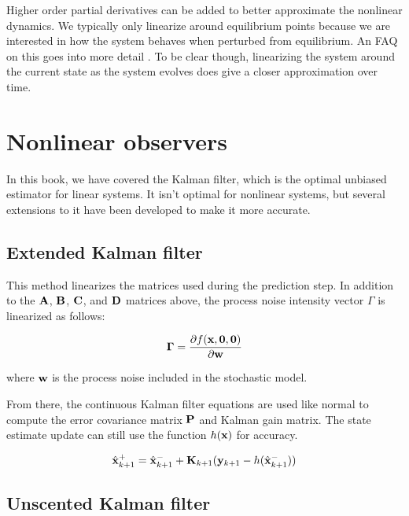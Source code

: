 Higher order partial derivatives can be added to better approximate the
nonlinear dynamics. We typically only linearize around equilibrium points
because we are interested in how the system behaves when perturbed from
equilibrium. An FAQ on this goes into more detail
\cite{bib:linearize-equilibrium-point}. To be clear though, linearizing the
system around the current state as the system evolves does give a closer
approximation over time.

\section{Nonlinear observers}

In this book, we have covered the Kalman filter, which is the optimal unbiased
estimator for linear systems. It isn't optimal for nonlinear systems, but
several extensions to it have been developed to make it more accurate.

\subsection{Extended Kalman filter}

This method linearizes the matrices used during the prediction step. In addition
to the $\mathbf{A}$, $\mathbf{B}$, $\mathbf{C}$, and $\mathbf{D}$ matrices above, the
process noise intensity vector $\Gamma$ is linearized as follows:

\begin{equation*}
  \mathbf{\Gamma} = \frac{\partial f(\mathbf{x}, \mathbf{0}, \mathbf{0})}{\partial \mathbf{w}}
\end{equation*}

where $\mathbf{w}$ is the process noise included in the stochastic model.

From there, the continuous Kalman filter equations are used like normal to
compute the error covariance matrix $\mathbf{P}$ and Kalman gain matrix. The state
estimate update can still use the function $h(\mathbf{x})$ for accuracy.

\begin{equation*}
  \hat{\mathbf{x}}_{k+1}^+ = \hat{\mathbf{x}}_{k+1}^- +
    \mathbf{K}_{k+1}(\mathbf{y}_{k+1} - h(\hat{\mathbf{x}}_{k+1}^-))
\end{equation*}

\subsection{Unscented Kalman filter}

